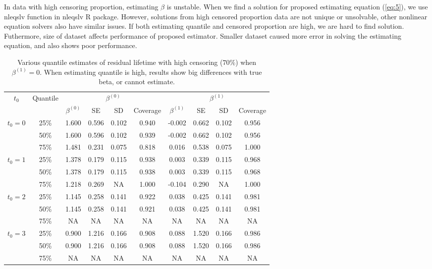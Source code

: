 \documentclass[titlepage,english,12pt]{article}
\begin{document}
	In data with high censoring proportion, estimating $\beta$ is unstable. When we find a solution for proposed estimating equation (\ref{eq:5}), we use nleqslv function in nleqslv R package. However, solutions from high censored proportion data are not unique or unsolvable, other nonlinear equation solvers also have similar issues. If both estimating quantile and censored proportion are high, we are hard to find solution. Futhermore, size of dataset affects performance of proposed estimator. Smaller dataset caused more error in solving the estimating equation, and also shows poor performance. 

	
	\begin{table}[H] \label{table:7}
		\caption{Various quantile estimates of residual lifetime with high censoring ($70\%$) when $\beta^{(1)} = 0$. When estimating quantile is high, results show big differences with true beta, or cannot estimate.}
		\centering
		\begin{tabular}{|c|c|c|c|c|c|c|c|c|c|}
			\hline
			\multirow{2}{*}{$t_0$} & \multirow{2}{*}{Quantile} & \multicolumn{4}{c|}{$\beta^{(0)}$} & \multicolumn{4}{c|}{$\beta^{(1)}$}\\ \cline{3-10}
			& & $\beta^{(0)}$ & SE & SD  & Coverage  & $\beta^{(1)}$ & SE & SD & Coverage\\
			\hline\hline
			\multirow{3}{*}{$t_0=0$} & 25\% & 1.600 & 0.596 & 0.102 & 0.940 & -0.002 & 0.662 & 0.102 & 0.956 \\
			& 50\% & 1.600 & 0.596 & 0.102 & 0.939 & -0.002 & 0.662 & 0.102 & 0.956 \\ 
			& 75\% & 1.481 & 0.231 & 0.075 & 0.818 & 0.016 & 0.538 & 0.075 & 1.000 \\ 
			\hline
			\multirow{3}{*}{$t_0=1$} & 25\% & 1.378 & 0.179 & 0.115 & 0.938 & 0.003 & 0.339 & 0.115 & 0.968 \\
			& 50\% & 1.378 & 0.179 & 0.115 & 0.938 & 0.003 & 0.339 & 0.115 & 0.968 \\
			& 75\% & 1.218 & 0.269 & NA & 1.000 & -0.104 & 0.290 & NA & 1.000 \\ 
			\hline
			\multirow{3}{*}{$t_0=2$} & 25\% & 1.145 & 0.258 & 0.141 & 0.922 & 0.038 & 0.425 & 0.141 & 0.981 \\ 
			& 50\% & 1.145 & 0.258 & 0.141 & 0.921 & 0.038 & 0.425 & 0.141 & 0.981 \\ 
			& 75\% & NA & NA & NA & NA & NA & NA & NA & NA \\ 
			\hline
			\multirow{3}{*}{$t_0=3$} & 25\% & 0.900 & 1.216 & 0.166 & 0.908 & 0.088 & 1.520 & 0.166 & 0.986 \\ 
			& 50\% & 0.900 & 1.216 & 0.166 & 0.908 & 0.088 & 1.520 & 0.166 & 0.986 \\ 
			& 75\% & NA & NA & NA & NA & NA & NA & NA & NA \\ 
			\hline
		\end{tabular}
	\end{table}
\end{document}
